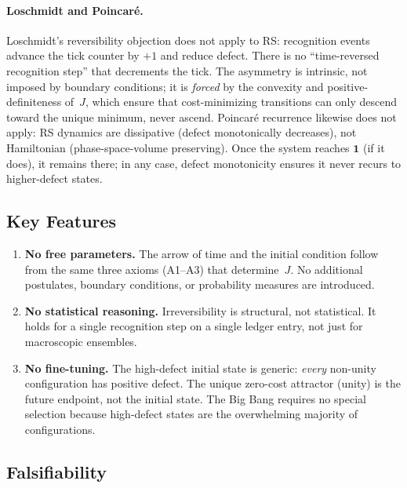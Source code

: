 \documentclass[12pt,a4paper]{article}
\theoremstyle{definition}
\theoremstyle{remark}
\begin{document}
\paragraph{Loschmidt and Poincar\'e.}
Loschmidt's reversibility objection does not apply to RS: recognition
events advance the tick counter by $+1$ and reduce defect.  There is no
``time-reversed recognition step'' that decrements the tick.  The
asymmetry is intrinsic, not imposed by boundary conditions; it is
\emph{forced} by the convexity and positive-definiteness of~$J$, which
ensure that cost-minimizing transitions can only descend toward the
unique minimum, never ascend.  Poincar\'e
recurrence likewise does not apply: RS dynamics are dissipative (defect
monotonically decreases), not Hamiltonian (phase-space-volume preserving).
Once the system reaches $\mathbf{1}$ (if it does), it remains there;
in any case, defect monotonicity ensures it never recurs to
higher-defect states.

\subsection{Key Features}

\begin{enumerate}
  \item \textbf{No free parameters.}  The arrow of time and the initial
  condition follow from the same three axioms (A1--A3) that determine~$J$.
  No additional postulates, boundary conditions, or probability measures
  are introduced.

  \item \textbf{No statistical reasoning.}  Irreversibility is structural,
  not statistical.  It holds for a single recognition step on a single
  ledger entry, not just for macroscopic ensembles.

  \item \textbf{No fine-tuning.}  The high-defect initial state is generic:
  \emph{every} non-unity configuration has positive defect.  The unique
  zero-cost attractor (unity) is the future endpoint, not the initial state.
  The Big Bang requires no special selection because high-defect states are
  the overwhelming majority of configurations.

\end{enumerate}

\subsection{Falsifiability}
\end{document}
